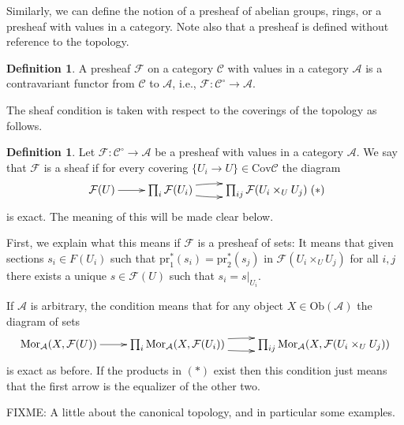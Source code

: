 \documentclass{amsart}
\theoremstyle{definition}
\newtheorem{definition}[theorem]{Definition}
\theoremstyle{remark}
\numberwithin{equation}{subsection}
\begin{document}
\smallskip\noindent
Similarly, we can define the notion of a presheaf of abelian groups, rings,
or a presheaf with values in a category. Note also that a presheaf is defined
without reference to the topology.

\begin{definition}
\label{definition-presheaf}
A presheaf $\mathcal{F}$ on a category $\mathcal{C}$ with values in a category
$\mathcal{A}$ is a contravariant functor from $\mathcal{C}$ to $\mathcal{A}$,
i.e., $\mathcal{F} : \mathcal{C}^\circ \to \mathcal{A}$.
\end{definition}

\noindent
The sheaf condition is taken with respect to the coverings of the 
topology as follows.

\begin{definition}
\label{definition-sheaf}
Let $\mathcal{F} : \mathcal{C}^\circ \to \mathcal{A}$ be a presheaf 
with values in a category $\mathcal{A}$. We say that $\mathcal{F}$ 
is a sheaf if for every covering $\{U_i \to U\} \in \text{Cov} \mathcal{C}$ 
the diagram
$$
\xymatrix{
\mathcal{F}(U) \ar[r] 
& 
\prod\nolimits_i \mathcal{F}(U_i) \ar@/^/[r] \ar@/_/[r] 
&
\prod\nolimits_{ij} \mathcal{F}(U_i\times_U U_j)
}
\leqno{(*)}
$$
is exact. The meaning of this will be made clear below.
\end{definition}

\noindent
First, we explain what this means if $\mathcal{F}$ is a presheaf of sets:
It means that given sections $s_i \in F(U_i)$ such that
$\text{pr}_1^\ast(s_i) = \text{pr}_2^\ast(s_j)$ in 
$\mathcal{F}(U_i \times_U U_j)$ for all $i,j$ there exists a unique
$s \in \mathcal{F}(U)$ such that $s_i = s|_{U_i}$.

\smallskip\noindent
If $\mathcal{A}$ is arbitrary, the condition means that for any
object $X\in \text{Ob}(\mathcal{A})$ the diagram of sets
$$
\xymatrix{
\text{Mor}_\mathcal{A}(X,\mathcal{F}(U)) \ar[r] 
& 
\prod\nolimits_i \text{Mor}_\mathcal{A}(X,\mathcal{F}(U_i)) 
\ar@/^/[r] \ar@/_/[r] 
&
\prod\nolimits_{ij} \text{Mor}_\mathcal{A}(X,\mathcal{F}(U_i\times_U U_j))
}
$$
is exact as before. If the products in $(*)$ exist then this condition just
means that the first arrow is the equalizer of the other two.

FIXME: A little about the canonical topology, and in particular some examples.
\end{document}
